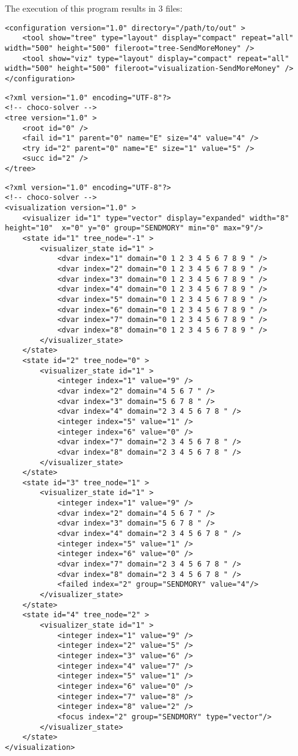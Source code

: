 \medskip
The execution of this program results in 3 files:
\begin{lstlisting}[title=configuration-SendMoreMoney.xml, captionpos=b]
<configuration version="1.0" directory="/path/to/out" >
	<tool show="tree" type="layout" display="compact" repeat="all" width="500" height="500" fileroot="tree-SendMoreMoney" />
	<tool show="viz" type="layout" display="compact" repeat="all" width="500" height="500" fileroot="visualization-SendMoreMoney" />
</configuration>
\end{lstlisting}

\begin{lstlisting}[title=tree-SendMoreMoney.xml, captionpos=b]
<?xml version="1.0" encoding="UTF-8"?>
<!-- choco-solver -->
<tree version="1.0" >
	<root id="0" />
	<fail id="1" parent="0" name="E" size="4" value="4" />
	<try id="2" parent="0" name="E" size="1" value="5" />
	<succ id="2" />
</tree>
\end{lstlisting}

\begin{lstlisting}[title=visualization-SendMoreMoney.xml,captionpos=b]
<?xml version="1.0" encoding="UTF-8"?>
<!-- choco-solver -->
<visualization version="1.0" >
	<visualizer id="1" type="vector" display="expanded" width="8" height="10"  x="0" y="0" group="SENDMORY" min="0" max="9"/>
	<state id="1" tree_node="-1" >
		<visualizer_state id="1" >
			<dvar index="1" domain="0 1 2 3 4 5 6 7 8 9 " />
			<dvar index="2" domain="0 1 2 3 4 5 6 7 8 9 " />
			<dvar index="3" domain="0 1 2 3 4 5 6 7 8 9 " />
			<dvar index="4" domain="0 1 2 3 4 5 6 7 8 9 " />
			<dvar index="5" domain="0 1 2 3 4 5 6 7 8 9 " />
			<dvar index="6" domain="0 1 2 3 4 5 6 7 8 9 " />
			<dvar index="7" domain="0 1 2 3 4 5 6 7 8 9 " />
			<dvar index="8" domain="0 1 2 3 4 5 6 7 8 9 " />
		</visualizer_state>
	</state>
	<state id="2" tree_node="0" >
		<visualizer_state id="1" >
			<integer index="1" value="9" />
			<dvar index="2" domain="4 5 6 7 " />
			<dvar index="3" domain="5 6 7 8 " />
			<dvar index="4" domain="2 3 4 5 6 7 8 " />
			<integer index="5" value="1" />
			<integer index="6" value="0" />
			<dvar index="7" domain="2 3 4 5 6 7 8 " />
			<dvar index="8" domain="2 3 4 5 6 7 8 " />
		</visualizer_state>
	</state>
	<state id="3" tree_node="1" >
		<visualizer_state id="1" >
			<integer index="1" value="9" />
			<dvar index="2" domain="4 5 6 7 " />
			<dvar index="3" domain="5 6 7 8 " />
			<dvar index="4" domain="2 3 4 5 6 7 8 " />
			<integer index="5" value="1" />
			<integer index="6" value="0" />
			<dvar index="7" domain="2 3 4 5 6 7 8 " />
			<dvar index="8" domain="2 3 4 5 6 7 8 " />
			<failed index="2" group="SENDMORY" value="4"/>
		</visualizer_state>
	</state>
	<state id="4" tree_node="2" >
		<visualizer_state id="1" >
			<integer index="1" value="9" />
			<integer index="2" value="5" />
			<integer index="3" value="6" />
			<integer index="4" value="7" />
			<integer index="5" value="1" />
			<integer index="6" value="0" />
			<integer index="7" value="8" />
			<integer index="8" value="2" />
			<focus index="2" group="SENDMORY" type="vector"/>
		</visualizer_state>
	</state>
</visualization>
\end{lstlisting}

